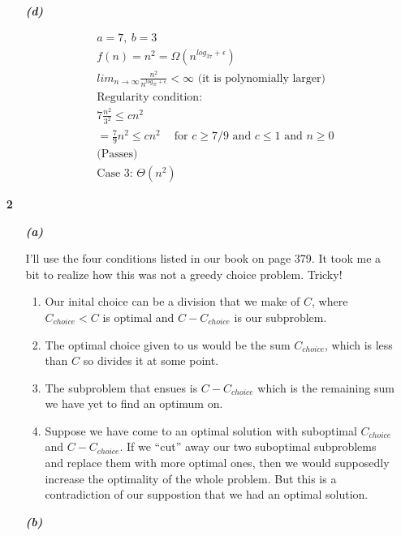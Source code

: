 \documentclass{article}
\begin{document}
\begin{enumerate}
\begin{enumerate}
		\item[\textbf{\emph{(d)}}]

			\begin{align*}
			& a = 7,\ b = 3 \\
			& f(n) = n^2 = \Omega(n^{log_37 + \epsilon}) \\
			& lim_{n\rightarrow \infty}\frac{n^2}{n^{log_37+ \epsilon}} < \infty \text{   (it is polynomially larger)} \\
			& \text{Regularity condition:} \\
			& 7\frac{n^2}{3^2} \leq cn^2 \\ 
			& = \frac{7}{9}n^2 \leq cn^2 \ \ \ \ \text{ for $c \geq 7/9$ and $c \leq 1$ and $n \geq 0$}\\ 
			& \text{(Passes)} \\
			& \text{Case 3: } \Theta(n^2)
			\end{align*}

	\end{enumerate}

	\item[\textbf{2}]
	
		\begin{enumerate}
		\item[\textbf{\emph{(a)}}]
			
			I'll use the four conditions listed in our book on page 379. It took me a
			bit to realize how this was not a greedy choice problem. Tricky!

			\begin{enumerate}
			\item Our inital choice can be a division that we make of $C$, where
			$C_{choice} < C$ is optimal and $C-C_{choice}$ is our subproblem.
			\item The optimal choice given to us would be the sum $C_{choice}$, which
			is less than $C$ so divides it at some point.
			\item The subproblem that ensues is $C- C_{choice}$ which is the
			remaining sum we have yet to find an optimum on.
			\item Suppose we have come to an optimal solution with suboptimal
			$C_{choice}$ and $C-C_{choice}$. If we ``cut'' away our two suboptimal
			subproblems and replace them with more optimal ones, then we would
			supposedly increase the optimality of the whole problem. But this is a
			contradiction of our suppostion that we had an optimal solution.
			\end{enumerate}

		\item[\textbf{\emph{(b)}}]


\end{enumerate}
\end{enumerate}
\end{document}

